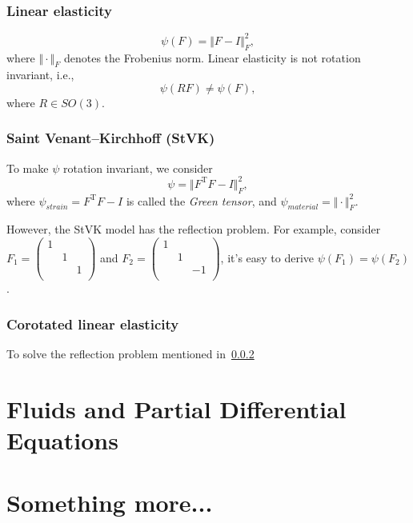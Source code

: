 \documentclass{fancydoc}
\newcommand{\trans}{\mathrm{T}}
\begin{document}
\subsubsection{Linear elasticity}\label{sec:psi_linear}
\begin{equation}
\psi (F) = \Vert F - I \Vert^2_F,
\end{equation}
where $\Vert \cdot \Vert_F$ denotes the Frobenius norm. Linear elasticity is not rotation invariant, i.e.,
\begin{equation}
\psi(RF) \neq \psi(F),
\end{equation}
where $R \in SO(3)$.

\subsubsection{Saint Venant–Kirchhoff (StVK)}\label{sec:psi_stvk}
To make $\psi$ rotation invariant, we consider
\begin{equation}
\psi = \Vert F^\trans F - I \Vert^2_F,
\end{equation}
where $\psi_{strain} = F^\trans F - I$ is called the \textit{Green tensor}, and $\psi_{material} = \Vert \cdot \Vert^2_F$.

However, the StVK model has the reflection problem. For example, consider $F_1 = \begin{pmatrix}
1 & & \\
 & 1 & \\
 & & 1 \\
\end{pmatrix}$ and $F_2 = \begin{pmatrix}
1 & & \\
& 1 & \\
& & -1\\
\end{pmatrix}$,
 it's easy to derive $\psi(F_1) = \psi(F_2)$.
 
\subsubsection{Corotated linear elasticity}\label{sec:psi_corot}
To solve the reflection problem mentioned in~\ref{sec:psi_stvk} 	

\section{Fluids and Partial Differential Equations}

\section{Something more...}
\end{document}
